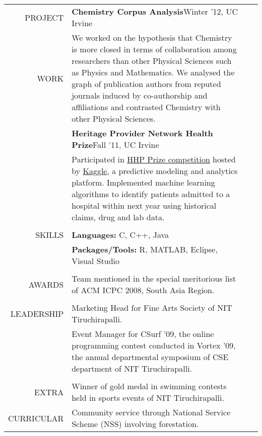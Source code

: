 \documentclass[a4paper]{article}
\begin{document}
\begin{tabularx}{\textwidth}{rX lX}
  \\*
  PROJECT & \textbf{Chemistry Corpus Analysis}\hfill Winter '12, UC Irvine\\
  WORK & We worked on the hypothesis that Chemistry is more closed in terms of collaboration among researchers than other Physical Sciences such as Physics and Mathematics. We analysed the graph of publication authors from reputed journals induced by co-authorship and affiliations and contrasted Chemistry with other Physical Sciences.\\
  [.5\baselineskip]
  & \textbf{Heritage Provider Network Health Prize}\hfill Fall '11, UC Irvine\\
  & Participated in \href{http://www.heritagehealthprize.com/c/hhp}{HHP Prize competition} hosted by \href{http://www.kaggle.com}{Kaggle}, a predictive modeling and analytics platform. Implemented machine learning algorithms to identify patients admitted to a hospital within next year using historical claims, drug and lab data.\\
  \\*
  SKILLS & \textbf{Languages: }C, C++, Java\\
  & \textbf{Packages/Tools: }R, MATLAB, Eclipse, Visual Studio\\
  \\*
  AWARDS & Team mentioned in the special meritorious list of ACM ICPC 2008, South Asia Region.\\
  \\*
  LEADERSHIP & Marketing Head for Fine Arts Society of NIT Tiruchirapalli.\\
  & Event Manager for CSurf ’09, the online programming contest conducted in Vortex ’09, the annual departmental symposium of CSE department of NIT Tiruchirapalli.\\
  \\*
  EXTRA & Winner of gold medal in swimming contests held in sports events of NIT Tiruchirapalli.\\
  CURRICULAR & Community service through National Service Scheme (NSS) involving forestation.
\end{tabularx}
\end{document}
